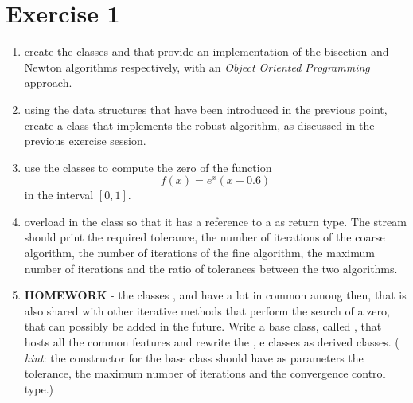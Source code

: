 \section*{Exercise 1}

\begin{enumerate}
    \item create the classes  and  that provide an
    implementation of the bisection and Newton algorithms respectively, with an
    \emph{Object Oriented Programming} approach.

    \item using the data structures that have been introduced in the previous
    point, create a  class that implements the robust algorithm, as
    discussed in the previous exercise session.

    \item use the classes to compute the zero of the function
        \begin{equation*}
            f(x) = e^x (x - 0.6)
        \end{equation*}
        in the interval $[0, 1]$.

    \item overload  in the  class so that
    it has a reference to a  as return type. The stream should
    print the required tolerance, the number of iterations of the coarse
    algorithm, the number of iterations of the fine algorithm, the maximum
    number of iterations and the ratio of tolerances between the two algorithms.

    \item \textbf{HOMEWORK} - the classes ,  and
     have a lot in common among then, that is also shared with
    other iterative methods that perform the search of a zero, that can possibly
    be added in the future.
    Write a base class, called , that hosts all the
    common features and rewrite the ,  e 
    classes as derived classes. ( \emph{hint}: the constructor for the base
    class should have as parameters the tolerance, the maximum number of
    iterations and the convergence control type.)

\end{enumerate}
